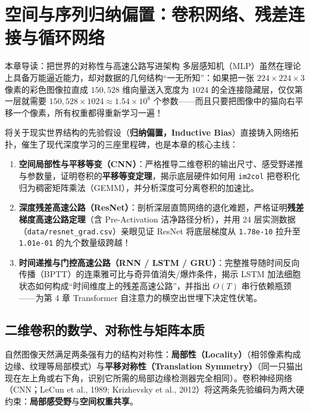 \chapter[卷积、残差网络与循环序列建模]{空间与序列归纳偏置：卷积网络、残差连接与循环网络}
\label{ch:cnn-resnet-rnn}


\begin{chapIntro}{本章导读：把世界的对称性与高速公路写进架构}
多层感知机（MLP）虽然在理论上具备万能逼近能力，却对数据的几何结构“一无所知”：如果把一张 $224 \times 224 \times 3$ 像素的彩色图像拉直成 $150{,}528$ 维向量送入宽度为 $1024$ 的全连接隐藏层，仅仅第一层就需要 $150{,}528 \times 1024 \approx 1.54 \times 10^8$ 个参数——而且只要把图像中的猫向右平移一个像素，所有权重都得重新学习一遍！

将关于现实世界结构的先验假设（\textbf{归纳偏置，Inductive Bias}）直接铸入网络拓扑，催生了现代深度学习的三座里程碑，也是本章的核心主线：
\begin{enumerate}
  \item \textbf{空间局部性与平移等变（CNN）}：严格推导二维卷积的输出尺寸、感受野递推与参数量，证明卷积的\textbf{平移等变定理}，揭示底层硬件如何用 \texttt{im2col} 把卷积化归为稠密矩阵乘法（GEMM），并分析深度可分离卷积的加速比。
  \item \textbf{深度残差高速公路（ResNet）}：剖析深层直筒网络的退化难题，严格证明\textbf{残差梯度高速公路定理}（含 Pre-Activation 洁净路径分析），并用 24 层实测数据（\texttt{data/resnet\_grad.csv}）亲眼见证 ResNet 将底层梯度从 \texttt{1.78e-10} 拉升至 \texttt{1.01e-01} 的九个数量级跨越！
  \item \textbf{时间递推与门控高速公路（RNN / LSTM / GRU）}：完整推导随时间反向传播（BPTT）的连乘雅可比与奇异值消失/爆炸条件，揭示 LSTM 加法细胞状态如何构成“时间维度上的残差高速公路”，并指出 $O(T)$ 串行依赖瓶颈——为第 4 章 Transformer 自注意力的横空出世埋下决定性伏笔。
\end{enumerate}
\end{chapIntro}

\section{二维卷积的数学、对称性与矩阵本质}
\label{sec:cnn-math}

自然图像天然满足两条强有力的结构对称性：\textbf{局部性（Locality）}（相邻像素构成边缘、纹理等局部模式）与\textbf{平移对称性（Translation Symmetry）}（同一只猫出现在左上角或右下角，识别它所需的局部边缘检测器完全相同）。卷积神经网络（CNN；LeCun et al., 1989; Krizhevsky et al., 2012）将这两条先验编码为两大硬约束：\textbf{局部感受野}与\textbf{空间权重共享}。

